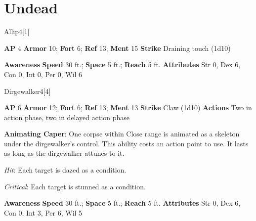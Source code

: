 \section{Undead}
\begin{monsection}{Allip}{4}[1]
\vspace{-1em}\vspace{-1em}
\begin{spellcontent}
\begin{spelltargetinginfo}
{\textbf{AP} 4}
\pari \textbf{Armor} 10;
\textbf{Fort} 6;
\textbf{Ref} 13;
\textbf{Ment} 15
\pari \textbf{Strike} Draining touch  (1d10)
\end{spelltargetinginfo}
\end{spellcontent}
\begin{spellsubcontent}
\begin{spellfooter}
\pari \textbf{Awareness} 
\pari \textbf{Speed} 30 ft.;
\textbf{Space} 5 ft.;
\textbf{Reach} 5 ft.
\pari \textbf{Attributes}
Str 0,
Dex 6,
Con 0,
Int 0,
Per 0,
Wil 6
\end{spellfooter}
\end{spellsubcontent}
\end{monsection}
\begin{monsection}{Dirgewalker}{4}[4]
\vspace{-1em}\vspace{-1em}
\begin{spellcontent}
\begin{spelltargetinginfo}
{\textbf{AP} 6}
\pari \textbf{Armor} 12;
\textbf{Fort} 6;
\textbf{Ref} 13;
\textbf{Ment} 13
\pari \textbf{Strike} Claw  (1d10)
\pari \textbf{Actions} Two in action phase, two in delayed action phase
\end{spelltargetinginfo}
\begin{spelleffects}
\pari
\textbf{Animating Caper}:
One corpse within Close range is animated as a skeleton under the dirgewalker's control.
This ability costs an action point to use.
It lasts as long as the dirgewalker attunes to it.
\vspace{0.5em}
\pari
{}
\par
\par \textit{Hit}: Each target is dazed as a condition.
\par \textit{Critical}: Each target is stunned as a condition.
\end{spelleffects}
\end{spellcontent}
\begin{spellsubcontent}
\begin{spellfooter}
\pari \textbf{Awareness} 
\pari \textbf{Speed} 30 ft.;
\textbf{Space} 5 ft.;
\textbf{Reach} 5 ft.
\pari \textbf{Attributes}
Str 0,
Dex 6,
Con 0,
Int 3,
Per 6,
Wil 5
\end{spellfooter}
\end{spellsubcontent}
\end{monsection}
